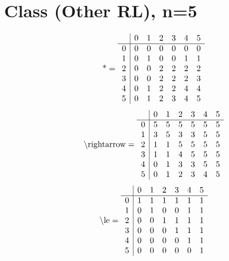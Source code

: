 \documentclass[11pt]{article}
\begin{document}
\section{Class (Other RL), n=5}
\[\text{*} = 
\begin{array}{r | r r r r r r}
 & 0 & 1 & 2 & 3 & 4 & 5 \\ \hline
0 & 0 & 0 & 0 & 0 & 0 & 0 \\
1 & 0 & 1 & 0 & 0 & 1 & 1 \\
2 & 0 & 0 & 2 & 2 & 2 & 2 \\
3 & 0 & 0 & 2 & 2 & 2 & 3 \\
4 & 0 & 1 & 2 & 2 & 4 & 4 \\
5 & 0 & 1 & 2 & 3 & 4 & 5 \\
\end{array}
\]
\[\text{\textbackslash rightarrow} = 
\begin{array}{r | r r r r r r}
 & 0 & 1 & 2 & 3 & 4 & 5 \\ \hline
0 & 5 & 5 & 5 & 5 & 5 & 5 \\
1 & 3 & 5 & 3 & 3 & 5 & 5 \\
2 & 1 & 1 & 5 & 5 & 5 & 5 \\
3 & 1 & 1 & 4 & 5 & 5 & 5 \\
4 & 0 & 1 & 3 & 3 & 5 & 5 \\
5 & 0 & 1 & 2 & 3 & 4 & 5 \\
\end{array}
\]
\[\text{\textbackslash le} = 
\begin{array}{r | r r r r r r}
 & 0 & 1 & 2 & 3 & 4 & 5 \\ \hline
0 & 1 & 1 & 1 & 1 & 1 & 1 \\
1 & 0 & 1 & 0 & 0 & 1 & 1 \\
2 & 0 & 0 & 1 & 1 & 1 & 1 \\
3 & 0 & 0 & 0 & 1 & 1 & 1 \\
4 & 0 & 0 & 0 & 0 & 1 & 1 \\
5 & 0 & 0 & 0 & 0 & 0 & 1 \\
\end{array}
\]
\end{document}
